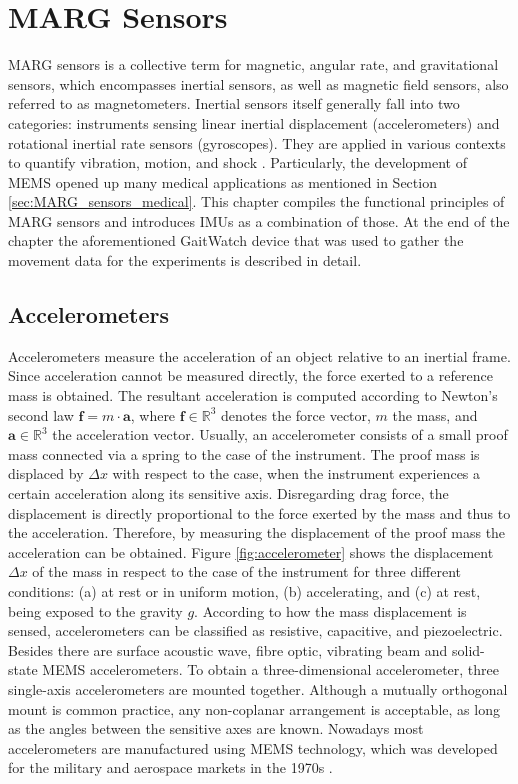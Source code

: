 \chapter{MARG Sensors}
\label{ch:MARG}

MARG sensors is a collective term for magnetic, angular rate, and gravitational sensors, which encompasses inertial sensors, as well as magnetic field sensors, also referred to as magnetometers. Inertial sensors itself generally fall into two categories: instruments sensing linear inertial displacement (accelerometers) and rotational inertial rate sensors (gyroscopes). They are applied in various contexts to quantify vibration, motion, and shock \cite{bhattacharyya_inertial_sensors_applications_13}. Particularly, the development of \gls{MEMS} opened up many medical applications as mentioned in Section \ref{sec:MARG_sensors_medical}. This chapter compiles the functional principles of MARG sensors and introduces \glspl{IMU} as a combination of those. At the end of the chapter the aforementioned GaitWatch device that was used to gather the movement data for the experiments is described in detail.

\section{Accelerometers}

Accelerometers measure the acceleration of an object relative to an inertial frame. Since acceleration cannot be measured directly, the force exerted to a reference mass is obtained. The resultant acceleration is computed according to Newton's second law $\mathbf{f} = m \cdot \mathbf{a}$, where $ \mathbf{f} \in \mathbb{R}^3$ denotes the force vector, $m$ the mass, and $\mathbf{a} \in \mathbb{R}^3$ the acceleration vector. Usually, an accelerometer consists of a small proof mass connected via a spring to the case of the instrument. The proof mass is displaced  by $\Delta x$ with respect to the case, when the instrument experiences a certain acceleration along its sensitive axis. Disregarding drag force, the displacement is directly proportional to the force exerted by the mass and thus to the acceleration. Therefore, by measuring the displacement of the proof mass the acceleration can be obtained. Figure \ref{fig:accelerometer} shows the displacement $\Delta x$ of the mass in respect to the case of the instrument for three different conditions: (a) at rest or in uniform motion, (b) accelerating, and (c) at rest, being exposed to the gravity $g$. According to how the mass displacement is sensed, accelerometers can be classified as resistive, capacitive, and piezoelectric. Besides there are surface acoustic wave, fibre optic, vibrating beam and solid-state \gls{MEMS} accelerometers. To obtain a three-dimensional accelerometer, three single-axis accelerometers are mounted together. Although a mutually orthogonal mount is common practice, any non-coplanar arrangement is acceptable, as long as the angles between the sensitive axes are known. Nowadays most accelerometers are manufactured using MEMS technology, which was developed for the military and aerospace markets in the 1970s \cite{bhattacharyya_inertial_sensors_applications_13}. 

